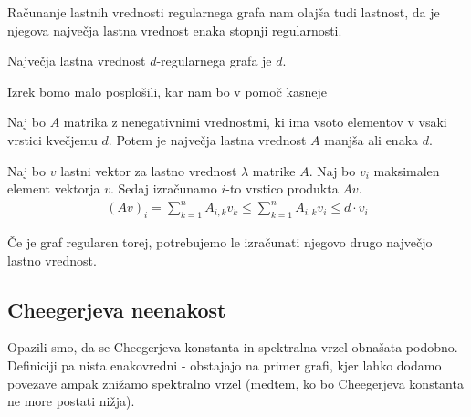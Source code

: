 Računanje lastnih vrednosti regularnega grafa nam olajša tudi lastnost, da je njegova največja lastna vrednost enaka stopnji regularnosti.
\begin{izrek}
    Največja lastna vrednost \(d\)-regularnega grafa je \(d\).
\end{izrek}

Izrek bomo malo posplošili, kar nam bo v pomoč kasneje
\begin{izrek}\label{def-najvecja-lv}
    Naj bo \(A\) matrika z nenegativnimi vrednostmi, ki ima vsoto elementov v vsaki vrstici kvečjemu \(d\). Potem je največja lastna vrednost \(A\) manjša ali enaka \(d\).
\end{izrek}
\begin{dokaz}
    Naj bo \(v\) lastni vektor za lastno vrednost \(\lambda\) matrike \(A\). Naj bo \(v_i\) maksimalen element vektorja \(v\). Sedaj izračunamo \(i\)-to vrstico produkta \(Av\).
    \begin{align*}
        (Av)_i = \sum_{k=1}^n A_{i,k}v_k \leq \sum_{k=1}^n A_{i,k}v_i \leq d\cdot v_i
    \end{align*}
\end{dokaz}
%
Če je graf regularen torej, potrebujemo le izračunati njegovo drugo največjo lastno vrednost.
\subsection{Cheegerjeva neenakost}
Opazili smo, da se Cheegerjeva konstanta in spektralna vrzel obnašata podobno. Definiciji pa nista enakovredni - obstajajo na primer grafi, kjer lahko dodamo povezave ampak znižamo spektralno vrzel (medtem, ko bo Cheegerjeva konstanta ne more postati nižja).

